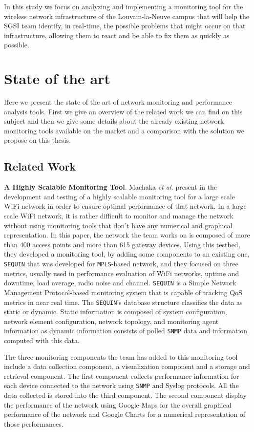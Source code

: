 In this study we focus on analyzing and implementing a monitoring tool for the wireless network infrastructure of the Louvain-la-Neuve campus that will help the SGSI team identify, in real-time, the possible problems that might occur on that infrastructure, allowing them to react and be able to fix them as quickly as possible.


\section{State of the art}
Here we present the state of the art of network monitoring and performance analysis tools.
First we give an overview of the related work we can find on this subject and then we give some details about the already existing network monitoring tools available on the market and a comparison with the solution we propose on this thesis.

\subsection{Related Work}

\textbf{A Highly Scalable Monitoring Tool}. Machaka \textit{et al.} present in \cite{article1} the development and testing of a highly scalable monitoring tool for a large scale WiFi network in order to ensure optimal performance of that network. In a large scale WiFi network, it is rather difficult to monitor and manage the network without using monitoring tools that don't have any numerical and graphical representation. In this paper, the network the team works on is composed of more than 400 access points and more than 615 gateway devices. Using this testbed, they developed a monitoring tool, by adding some components to an existing one, \texttt{SEQUIN} \cite{sequin} that was developed for \texttt{MPLS}-based network, and they focused on three metrics, usually used in performance evaluation of WiFi networks, uptime and downtime, load average, radio noise and channel. \texttt{SEQUIN} is a Simple Network Management Protocol-based monitoring system that is capable of tracking QoS metrics in near real time. The \texttt{SEQUIN}'s database structure classifies the data as static or dynamic. Static information is composed of system configuration, network element configuration, network topology, and monitoring agent information as dynamic information consists of polled \texttt{SNMP} data and information computed with this data. 

The three monitoring components the team has added to this monitoring tool include a data collection component, a visualization component and a storage and retrieval component. The first component collects performance information for each device connected to the network using \texttt{SNMP} and {Syslog} protocols. All the data collected is stored into the third component. The second component display the performance of the network using Google Maps for the overall graphical performance of the network and Google Charts for a numerical representation of those performances.

